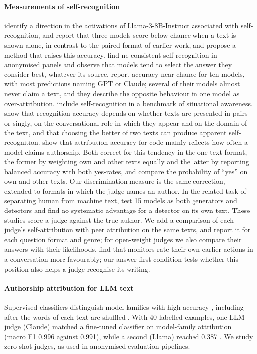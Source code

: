 \paragraph{Measurements of self-recognition}
\citet{ackerman2025inspection} identify a direction in the activations of
Llama-3-8B-Instruct associated with self-recognition, and
\citet{zhou2025implicit} report that three models score below chance when a
text is shown alone, in contrast to the paired format of earlier work, and
propose a method that raises this accuracy.
\citet{davidson2024anonymized} find no consistent self-recognition in
anonymised panels and observe that models tend to select the answer they
consider best, whatever its source. \citet{bai2025selfrecognition} report
accuracy near chance for ten models, with most predictions naming GPT or
Claude; several of their models almost never claim a text, and they describe
the opposite behaviour in one model as over-attribution.
\citet{laine2024sad} include self-recognition in a benchmark of situational
awareness. \citet{stamand2026sgtr} show that recognition accuracy depends on
whether texts are presented in pairs or singly, on the conversational role in
which they appear and on the domain of the text, and that choosing the better
of two texts can produce apparent self-recognition.
\citet{barkhordar2026stylenotself} show that attribution accuracy for code
mainly reflects how often a model claims authorship. Both correct for this
tendency in the one-text format, the former by weighting own and other texts
equally and the latter by reporting balanced accuracy with both yes-rates, and
\citet{ackerman2025inspection} compare the probability of ``yes'' on own and
other texts. Our discrimination measure is the same correction, extended to
formats in which the judge names an author. In the related task of separating
human from machine text, \citet{yuan2026crossgeneration} test 15 models as both
generators and detectors and find no systematic advantage for a detector on its
own text. These studies score a judge against the true author. We add a
comparison of each judge's self-attribution with peer attribution on the same
texts, and report it for each question format and genre; for open-weight judges
we also compare their answers with their likelihoods.
\citet{khullar2026selfattribution} find that monitors rate their own
earlier actions in a conversation more favourably; our answer-first condition
tests whether this position also helps a judge recognise its writing.

\paragraph{Authorship attribution for LLM text}
Supervised classifiers distinguish model families with high accuracy
\citep{sun2025stylometric, bitton2025fingerprints, rosenfeld2026whose,
russell2026storyscope}, including after the words of each text are shuffled
\citep{sun2025stylometric}. With 40 labelled examples, one LLM judge (Claude)
matched a fine-tuned classifier on model-family attribution (macro F1 0.996
against 0.991), while a second (Llama) reached 0.387
\citep{dietrich2026splits}. We study zero-shot
judges, as used in anonymised evaluation pipelines.

